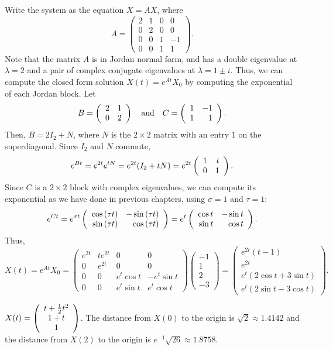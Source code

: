 \documentclass{ximera}
\begin{document}
\soln Write the system as the equation $\dot{X} = AX$, where
\[
A =
\left(\begin{array}{rrrr}
2 & 1 & 0 & 0 \\
0 & 2 & 0 & 0 \\
0 & 0 & 1 & -1 \\
0 & 0 & 1 & 1
\end{array}\right).
\]
Note that the matrix $A$ is in Jordan normal form, and has a double
eigenvalue at $\lambda = 2$ and a pair of complex conjugate eigenvalues
at $\lambda = 1 \pm i$.  Thus, we can compute the closed form solution
$X(t) = e^{At}X_0$ by computing the exponential of each Jordan block.  Let
\[
B = \left(\begin{array}{rr} 2 & 1\\ 0 &2\end{array}\right) \quad\mbox{and}\quad C = \left(\begin{array}{rr} 1 & -1\\ 1 &1\end{array}\right).
\]
Then, $B = 2I_2 + N$, where $N$ is the $2 \times 2$ matrix with an entry $1$
on the superdiagonal.  Since $I_2$ and $N$ commute,
\[
e^{Bt} = e^{2t}e^{tN} = e^{2t}(I_2 + tN) =
e^{2t}\left(\begin{array}{rr} 1 & t\\ 0 &1\end{array}\right).
\]
Since $C$ is a $2 \times 2$ block with complex eigenvalues, we can
compute its exponential as we have done in previous chapters, using
$\sigma = 1$ and $\tau = 1$:
\[
e^{Ct} = e^{\sigma t}\left(\begin{array}{rr} \cos{(\tau t)} & -\sin{(\tau t)}\\ \sin{(\tau t)} &\cos{(\tau t)}\end{array}\right)
= e^{t}\left(\begin{array}{rr} \cos{t} & -\sin{t}\\ \sin{t} &\cos{t}\end{array}\right).
\]
Thus,
\[
X(t) = e^{At}X_0 =
\left(\begin{array}{cccc}
e^{2t} & te^{2t} & 0 & 0 \\
0 & e^{2t} & 0 & 0 \\
0 & 0 & e^t\cos{t} & -e^t\sin{t} \\
0 & 0 & e^t\sin{t} & e^t\cos{t}
\end{array}\right)
\left(\begin{array}{r} -1 \\ 1 \\ 2 \\ -3 \end{array}\right)
= \left(\begin{array}{c}
e^{2t}(t - 1) \\
e^{2t} \\
e^t(2\cos{t} + 3\sin{t}) \\
e^t(2\sin{t} - 3\cos{t})
\end{array}\right).
\]

  \ans $X(t) = \left(\begin{array}{c} t + \frac{1}{2}t^2 \\ 1 + t \\ 1\end{array}\right)$. The distance from $X(0)$ to the 
origin is $\sqrt{2} \approx 1.4142$ and the distance from $X(2)$ to the origin is
$e^{-1}\sqrt{26} \approx 1.8758$.
\end{document}
